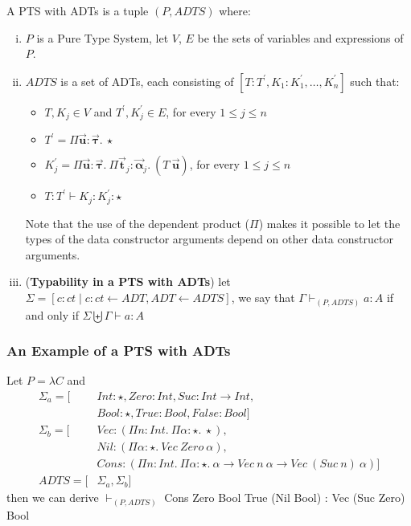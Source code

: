 \documentclass[oneside,a4paper]{article}
\numberwithin{equation}{section}
\begin{document}
A PTS with ADTs is a tuple $(P, ADTS)$ where:

\begin{enumerate}[(i)]
\item $P$ is a Pure Type System, let $V$, $E$ be the sets of variables
  and expressions of $P$.
\item $ADTS$ is a set of ADTs, each consisting of
  $[T : T^{\prime}, K_{1} : K_{1}^{\prime}, \dots, K_{n}^{\prime}]$
  such that:
  \begin{itemize}
  \item $T, K_{j} \in V$ and $T^{\prime}, K_{j}^{\prime} \in E$, for
    every $1 \leqslant j \leqslant n$
  \item
    $T^{\prime} = \Pi \vec{\mathbf{u}} : \vec{\mathbf{\tau}}.\ \star$
  \item
    $K_{j}^{\prime} = \Pi \vec{\mathbf{u}} : \vec{\mathbf{\tau}}.\ \Pi
    \vec{\mathbf{t}}_j: \vec{\mathbf{\alpha}}_{j}.\ (T\
    \vec{\mathbf{u}}) $, for every $1 \leqslant j \leqslant n$
  \item $T : T^{\prime} \vdash K_{j} : K_{j}^{\prime} : \star$
  \end{itemize}
  Note that the use of the dependent product ($\Pi$) makes it possible
  to let the types of the data constructor arguments depend on other
  data constructor arguments.
\item (\textbf{Typability in a PTS with ADTs}) let
  $\Sigma = [c : ct \mid c : ct \leftarrow ADT, ADT \leftarrow ADTS]$,
  we say that $\Gamma \vdash_{(P,ADTS)} a : A$ if and only if
  $\Sigma \biguplus \Gamma \vdash a : A$
\end{enumerate}

\subsubsection{An Example of a PTS with ADTs}

Let $P = \lambda C$ and
\begin{align*}
  \Sigma_{a} = [&Int : \star, Zero : Int, Suc : Int \rightarrow Int,\\
                &Bool : \star, True : Bool, False : Bool]\\
  \Sigma_{b} = [&Vec : (\Pi n : Int.\ \Pi \alpha : \star.\ \star),\\
                &Nil : (\Pi \alpha : \star.\ Vec\ Zero\ \alpha),\\
                &Cons : (\Pi n : Int.\ \Pi \alpha : \star.\ \alpha \rightarrow Vec\ n\ \alpha \rightarrow Vec\ (Suc\ n)\ \alpha)]\\
  ADTS = [&\Sigma_{a}, \Sigma_{b}]
\end{align*}
then we can derive $\vdash_{(P, ADTS)}$ Cons Zero Bool True (Nil Bool) : Vec (Suc Zero) Bool
\end{document}

